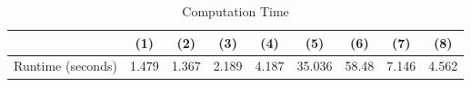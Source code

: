 \begin{table}[htbp]\centering
\caption{Computation Time}
\begin{tabular}{l*{8}{c}}
\hline\hline
            &         (1)&         (2)&         (3)&         (4)&         (5)&         (6)&         (7)&         (8)\\
\hline
Runtime (seconds)&       1.479&       1.367&       2.189&       4.187&      35.036&       58.48&       7.146&       4.562\\
\hline\hline
\end{tabular}
\end{table}
